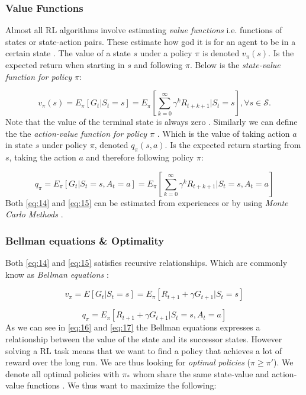\documentclass{kththesis}
\theoremstyle{definition}
\begin{document}
\subsubsection*{Value Functions}

Almost all RL algorithms involve estimating \textit{value functions} i.e. functions of states or state-action pairs. These estimate how god it is for an agent to be in a certain state \parencite{sutton1998reinforcement, li2017deep}. The value of a state $s$ under a policy $\pi$ is denoted $v_{\pi}(s)$. Is the expected return when starting in $s$ and following $\pi$. Below is the \textit{state-value function for policy $\pi$}:

\begin{equation}
    \label{eq:14}
    v_{\pi}(s) = E_{\pi}[G_t | S_t = s] = E_{\pi}\left[\sum_{k=0}^{\infty}{\gamma^{k}R_{t+k+1}} | S_t = s\right], \forall s \in \mathcal{S}.
\end{equation}
Note that the value of the terminal state is always zero \parencite{sutton1998reinforcement}. Similarly  we can define the the \textit{action-value function for policy $\pi$} \parencite{sutton1998reinforcement}. Which is the value of taking action $a$ in state $s$ under policy $\pi$, denoted $q_{\pi}(s,a)$. Is the expected return starting from $s$, taking the action $a$ and therefore following policy $\pi$:

\begin{equation}
    \label{eq:15}
    q_{\pi} = E_{\pi}[G_t | S_t =s, A_t = a] = E_{\pi} \left[\sum_{k=0}^{\infty}{\gamma^{k}R_{t+k+1}} | S_t=s, A_t=a \right]
\end{equation}
Both \autoref{eq:14} and \autoref{eq:15} can be estimated from experiences or by using \textit{Monte Carlo Methods} \parencite{sutton1998reinforcement}.

\subsubsection*{Bellman equations \& Optimality}
Both \autoref{eq:14} and \autoref{eq:15} satisfies recursive relationships. Which are commonly know as \textit{Bellman equations} \parencite{sutton1998reinforcement}:

\begin{equation}
    \label{eq:16}
    v_{\pi} = E[G_t | S_t = s] = E_{\pi}[R_{t+1} + \gamma G_{t+1} | S_t = s]
\end{equation}

\begin{equation}
    \label{eq:17}
    q_{\pi} = E_{\pi}[R_{t+1} + \gamma G_{t+1} | S_t = s,  A_t = a]
\end{equation}
As we can see in \autoref{eq:16} and \autoref{eq:17} the Bellman equations expresses a relationship between the value of the state and its successor states. However solving a RL task means that we want to find a policy that achieves a lot of reward over the long run. We are thus looking for \textit{optimal policies} ($\pi \geq \pi'$). We denote all optimal policies with $\pi_{*}$ whom share the same state-value and action-value functions \parencite{sutton1998reinforcement}. We thus want to maximize the following:
\end{document}
